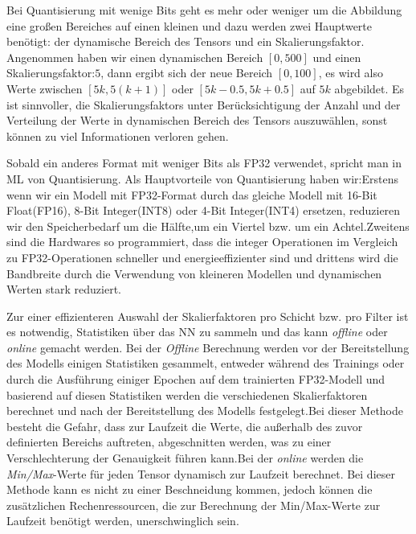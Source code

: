 \documentclass[12pt,a4paper]{scrartcl}
\numberwithin{equation}{section}
\begin{document}
Bei Quantisierung mit wenige Bits geht es mehr oder weniger um die Abbildung eine großen Bereiches auf einen kleinen und dazu werden zwei Hauptwerte benötigt: der dynamische Bereich des Tensors und ein Skalierungsfaktor. Angenommen haben wir einen dynamischen Bereich $ [0,500] $ und einen Skalierungsfaktor:$ 5 $, dann ergibt sich der neue Bereich $ [0, 100] $, es wird also Werte zwischen $ [5k, 5(k+1)] $ oder $ [5k -0.5, 5k +0.5] $ auf $ 5k $ abgebildet. Es ist sinnvoller,  die Skalierungsfaktors unter Berücksichtigung der Anzahl und der Verteilung der Werte in dynamischen Bereich des Tensors auszuwählen, sonst können zu viel Informationen verloren gehen.

Sobald ein anderes Format mit weniger Bits als FP32 verwendet, spricht man in \ac{ML} von Quantisierung.
Als Hauptvorteile von Quantisierung haben wir:Erstens wenn wir ein Modell mit FP32-Format durch das gleiche Modell mit 16-Bit Float(FP16), 8-Bit Integer(INT8)  oder 4-Bit Integer(INT4)  ersetzen, reduzieren wir den Speicherbedarf um die Hälfte,um ein Viertel bzw. um ein Achtel.Zweitens sind die Hardwares so programmiert, dass die integer Operationen im Vergleich zu FP32-Operationen schneller und energieeffizienter sind und drittens wird die Bandbreite durch die Verwendung von kleineren Modellen und dynamischen Werten stark reduziert.
		
Zur einer effizienteren Auswahl der Skalierfaktoren pro Schicht bzw. pro Filter ist es notwendig, Statistiken  über das \ac{NN} zu sammeln und das kann \textit{offline} oder \textit{online} gemacht werden. Bei der \textit{Offline} Berechnung werden vor der Bereitstellung des Modells einigen Statistiken gesammelt, entweder während des Trainings oder durch die Ausführung einiger Epochen auf dem trainierten FP32-Modell und basierend auf diesen Statistiken werden die verschiedenen Skalierfaktoren berechnet und nach der Bereitstellung des Modells festgelegt.Bei dieser Methode besteht die Gefahr, dass zur Laufzeit die Werte, die außerhalb des zuvor definierten Bereichs auftreten, abgeschnitten werden, was zu einer Verschlechterung der Genauigkeit führen kann.Bei der \textit{online} werden die \textit{Min/Max}-Werte für jeden Tensor dynamisch zur Laufzeit berechnet. Bei dieser Methode kann es nicht zu einer Beschneidung kommen, jedoch können die zusätzlichen Rechenressourcen, die zur Berechnung der Min/Max-Werte zur Laufzeit benötigt werden, unerschwinglich sein.\cite{quantization1}
\end{document}
